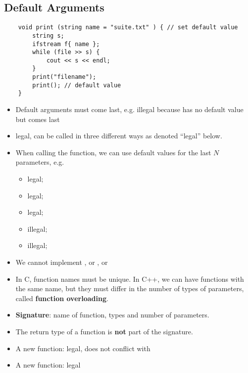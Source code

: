 \subsection{Default Arguments}
\begin{lstlisting}
    void print (string name = "suite.txt" ) { // set default value
        string s;
        ifstream f{ name };
        while (file >> s) {
            cout << s << endl;
        }
        print("filename");
        print(); // default value
    }
\end{lstlisting}
\begin{itemize}
    \item Default arguments must come last, e.g. 
          \textrightarrow{}  illegal because  has no default value but comes last
    \item {} \textrightarrow{} legal,
          can be called in three different ways as denoted ``legal'' below.
    \item When calling the function, we can use default values for the last
          $ N $ parameters, e.g. \textrightarrow{}
          \begin{itemize}
              \item {} \textrightarrow{} legal;
              \item {} \textrightarrow{} legal;
              \item {} \textrightarrow{} legal;
              \item {} \textrightarrow{} illegal;
              \item {} \textrightarrow{} illegal;
          \end{itemize}
    \item We cannot implement , or , or
    \item In C, function names must be unique. In C++, we can have functions with
          the same name, but they must differ in the number of types of parameters,
          called \textbf{function overloading}.
    \item \textbf{Signature}: name of function, types and number of parameters.
    \item The return type of a function is \textbf{not} part of the signature.
    \item A new function:  \textrightarrow{} legal,
          does not conflict with 
    \item A new function:  \textrightarrow{} legal
\end{itemize}

